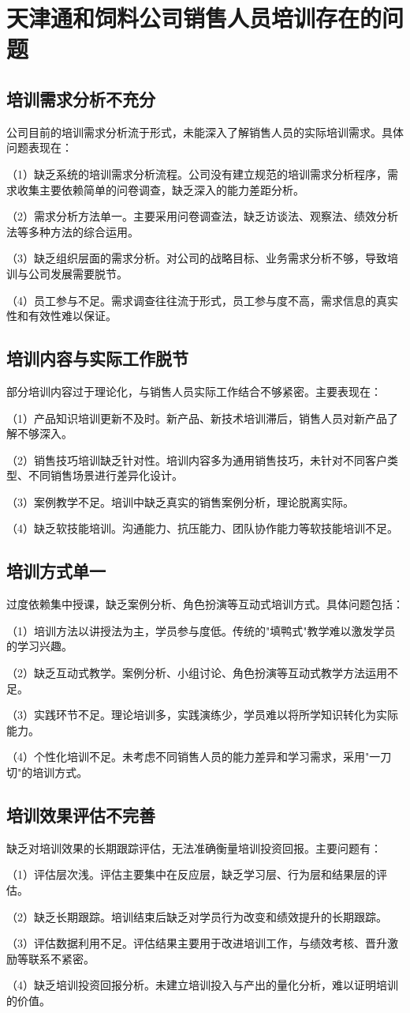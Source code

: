 \section{天津通和饲料公司销售人员培训存在的问题}

\subsection{培训需求分析不充分}

公司目前的培训需求分析流于形式，未能深入了解销售人员的实际培训需求。具体问题表现在：

（1）缺乏系统的培训需求分析流程。公司没有建立规范的培训需求分析程序，需求收集主要依赖简单的问卷调查，缺乏深入的能力差距分析。

（2）需求分析方法单一。主要采用问卷调查法，缺乏访谈法、观察法、绩效分析法等多种方法的综合运用。

（3）缺乏组织层面的需求分析。对公司的战略目标、业务需求分析不够，导致培训与公司发展需要脱节。

（4）员工参与不足。需求调查往往流于形式，员工参与度不高，需求信息的真实性和有效性难以保证。

\subsection{培训内容与实际工作脱节}

部分培训内容过于理论化，与销售人员实际工作结合不够紧密。主要表现在：

（1）产品知识培训更新不及时。新产品、新技术培训滞后，销售人员对新产品了解不够深入。

（2）销售技巧培训缺乏针对性。培训内容多为通用销售技巧，未针对不同客户类型、不同销售场景进行差异化设计。

（3）案例教学不足。培训中缺乏真实的销售案例分析，理论脱离实际。

（4）缺乏软技能培训。沟通能力、抗压能力、团队协作能力等软技能培训不足。

\subsection{培训方式单一}

过度依赖集中授课，缺乏案例分析、角色扮演等互动式培训方式。具体问题包括：

（1）培训方法以讲授法为主，学员参与度低。传统的"填鸭式"教学难以激发学员的学习兴趣。

（2）缺乏互动式教学。案例分析、小组讨论、角色扮演等互动式教学方法运用不足。

（3）实践环节不足。理论培训多，实践演练少，学员难以将所学知识转化为实际能力。

（4）个性化培训不足。未考虑不同销售人员的能力差异和学习需求，采用"一刀切"的培训方式。

\subsection{培训效果评估不完善}

缺乏对培训效果的长期跟踪评估，无法准确衡量培训投资回报。主要问题有：

（1）评估层次浅。评估主要集中在反应层，缺乏学习层、行为层和结果层的评估。

（2）缺乏长期跟踪。培训结束后缺乏对学员行为改变和绩效提升的长期跟踪。

（3）评估数据利用不足。评估结果主要用于改进培训工作，与绩效考核、晋升激励等联系不紧密。

（4）缺乏培训投资回报分析。未建立培训投入与产出的量化分析，难以证明培训的价值。
